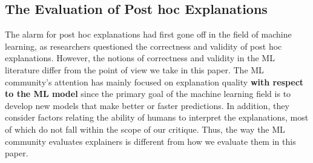 \documentclass[mnsc,blindrev]{informs3}
\begin{document}
    \subsection{The Evaluation of Post hoc Explanations}
        \label{sec:cs_critique}
        The alarm for post hoc explanations had first gone off in the field of machine learning, as researchers questioned the correctness and validity of post hoc explanations. However, the notions of correctness and validity in the ML literature differ from the point of view we take in this paper. The ML community's attention has mainly focused on explanation quality \textbf{with respect to the ML model} since the primary goal of the machine learning field is to develop new models that make better or faster predictions. In addition, they consider factors relating the ability of humans to interpret the explanations, most of which do not fall within the scope of our critique. Thus, the way the ML community evaluates explainers is different from how we evaluate them in this paper.
\end{document}
